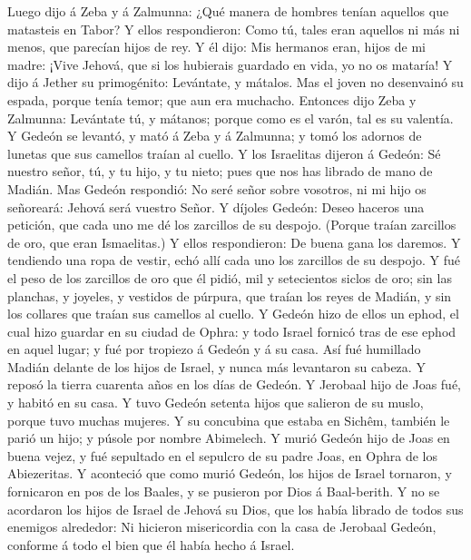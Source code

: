  Luego dijo á Zeba y á Zalmunna: ¿Qué manera de hombres
tenían aquellos que matasteis en Tabor? Y ellos respondieron: Como tú,
tales eran aquellos ni más ni menos, que parecían hijos de rey.
 Y él dijo: Mis hermanos eran, hijos de mi madre: ¡Vive
Jehová, que si los hubierais guardado en vida, yo no os mataría!
 Y dijo á Jether su primogénito: Levántate, y mátalos.
Mas el joven no desenvainó su espada, porque tenía temor; que aun era
muchacho.  Entonces dijo Zeba y Zalmunna: Levántate tú, y
mátanos; porque como es el varón, tal es su valentía. Y Gedeón se
levantó, y mató á Zeba y á Zalmunna; y tomó los adornos de lunetas que
sus camellos traían al cuello.  Y los Israelitas dijeron
á Gedeón: Sé nuestro señor, tú, y tu hijo, y tu nieto; pues que nos has
librado de mano de Madián.  Mas Gedeón respondió: No seré
señor sobre vosotros, ni mi hijo os señoreará: Jehová será vuestro
Señor.  Y díjoles Gedeón: Deseo haceros una petición, que
cada uno me dé los zarcillos de su despojo. (Porque traían zarcillos de
oro, que eran Ismaelitas.)  Y ellos respondieron: De
buena gana los daremos. Y tendiendo una ropa de vestir, echó allí cada
uno los zarcillos de su despojo.  Y fué el peso de los
zarcillos de oro que él pidió, mil y setecientos siclos de oro; sin las
planchas, y joyeles, y vestidos de púrpura, que traían los reyes de
Madián, y sin los collares que traían sus camellos al cuello.
 Y Gedeón hizo de ellos un ephod, el cual hizo guardar en
su ciudad de Ophra: y todo Israel fornicó tras de ese ephod en aquel
lugar; y fué por tropiezo á Gedeón y á su casa.  Así fué
humillado Madián delante de los hijos de Israel, y nunca más levantaron
su cabeza. Y reposó la tierra cuarenta años en los días de Gedeón.
 Y Jerobaal hijo de Joas fué, y habitó en su casa.
 Y tuvo Gedeón setenta hijos que salieron de su muslo,
porque tuvo muchas mujeres.  Y su concubina que estaba en
Sichêm, también le parió un hijo; y púsole por nombre Abimelech.
 Y murió Gedeón hijo de Joas en buena vejez, y fué
sepultado en el sepulcro de su padre Joas, en Ophra de los Abiezeritas.
 Y aconteció que como murió Gedeón, los hijos de Israel
tornaron, y fornicaron en pos de los Baales, y se pusieron por Dios á
Baal-berith.  Y no se acordaron los hijos de Israel de
Jehová su Dios, que los había librado de todos sus enemigos alrededor:
 Ni hicieron misericordia con la casa de Jerobaal Gedeón,
conforme á todo el bien que él había hecho á Israel.

